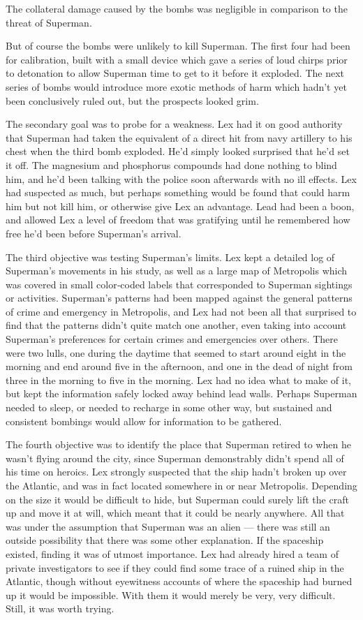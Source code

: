 The collateral damage caused by the bombs was negligible in comparison
to the threat of Superman.

But of course the bombs were unlikely to kill Superman. The first four
had been for calibration, built with a small device which gave a series
of loud chirps prior to detonation to allow Superman time to get to it
before it exploded. The next series of bombs would introduce more exotic
methods of harm which hadn't yet been conclusively ruled out, but the
prospects looked grim.

The secondary goal was to probe for a weakness. Lex had it on good
authority that Superman had taken the equivalent of a direct hit from
navy artillery to his chest when the third bomb exploded. He'd simply
looked surprised that he'd set it off. The magnesium and phosphorus
compounds had done nothing to blind him, and he'd been talking with the
police soon afterwards with no ill effects. Lex had suspected as much,
but perhaps something would be found that could harm him but not kill
him, or otherwise give Lex an advantage. Lead had been a boon, and
allowed Lex a level of freedom that was gratifying until he remembered
how free he'd been before Superman's arrival.

The third objective was testing Superman's limits. Lex kept a detailed
log of Superman's movements in his study, as well as a large map of
Metropolis which was covered in small color‐coded labels that
corresponded to Superman sightings or activities. Superman's patterns
had been mapped against the general patterns of crime and emergency in
Metropolis, and Lex had not been all that surprised to find that the
patterns didn't quite match one another, even taking into account
Superman's preferences for certain crimes and emergencies over others.
There were two lulls, one during the daytime that seemed to start around
eight in the morning and end around five in the afternoon, and one in
the dead of night from three in the morning to five in the morning. Lex
had no idea what to make of it, but kept the information safely locked
away behind lead walls. Perhaps Superman needed to sleep, or needed to
recharge in some other way, but sustained and consistent bombings would
allow for information to be gathered.

The fourth objective was to identify the place that Superman retired to
when he wasn't flying around the city, since Superman demonstrably
didn't spend all of his time on heroics. Lex strongly suspected that the
ship hadn't broken up over the Atlantic, and was in fact located
somewhere in or near Metropolis. Depending on the size it would be
difficult to hide, but Superman could surely lift the craft up and move
it at will, which meant that it could be nearly anywhere. All that was
under the assumption that Superman was an alien --- there was still an
outside possibility that there was some other explanation. If the
spaceship existed, finding it was of utmost importance. Lex had already
hired a team of private investigators to see if they could find some
trace of a ruined ship in the Atlantic, though without eyewitness
accounts of where the spaceship had burned up it would be impossible.
With them it would merely be very, very difficult. Still, it was worth
trying.

